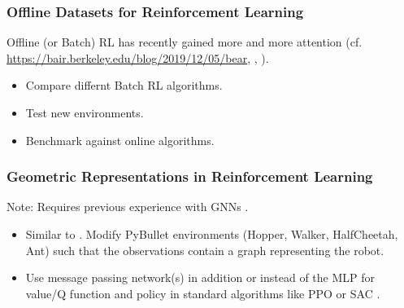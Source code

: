 \documentclass[a4paper]{article}
\begin{document}
\subsubsection{Offline Datasets for Reinforcement Learning}
Offline (or Batch) RL has recently gained more and more attention (cf. \url{https://bair.berkeley.edu/blog/2019/12/05/bear}, \cite{Agarwal2019}, \cite{nair2020}).
\begin{itemize}
  \item Compare differnt Batch RL algorithms.
  \item Test new environments.
  \item Benchmark against online algorithms.
\end{itemize}

\subsubsection{Geometric Representations in Reinforcement Learning}
Note: Requires previous experience with GNNs \cite{kipf2016semisupervised}.
\begin{itemize}
  \item Similar to \cite{Wang2018nervenet}. Modify PyBullet environments (Hopper, Walker, HalfCheetah, Ant) such that the observations contain a graph representing the robot.
  \item Use message passing network(s) in addition or instead of the MLP for value/Q function and policy in standard algorithms like PPO \cite{Schulman2017} or SAC \cite{Haarnoja2018a}.
\end{itemize}




\end{document}
